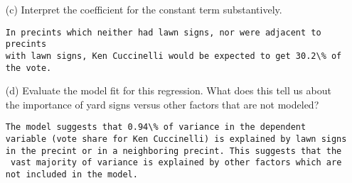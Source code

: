 \documentclass[12pt,letterpaper]{article}
\begin{document}
\begin{enumerate}
	\vspace{7cm}
	\item [(c)] Interpret the coefficient for the constant term substantively.
	\vspace{7cm}
	
\begin{verbatim}
In precints which neither had lawn signs, nor were adjacent to precints
with lawn signs, Ken Cuccinelli would be expected to get 30.2\% of the vote.
\end{verbatim}


	\item [(d)] Evaluate the model fit for this regression.  What does this	tell us about the importance of yard signs versus other factors that are not modeled?

\begin{verbatim}
The model suggests that 0.94\% of variance in the dependent
variable (vote share for Ken Cuccinelli) is explained by lawn signs
in the precint or in a neighboring precint. This suggests that the
 vast majority of variance is explained by other factors which are
not included in the model.
\end{verbatim}	


\end{enumerate}  
\end{document}

